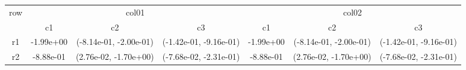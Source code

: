 \begin{tabular}{ccccccc}
\toprule
\multirow{2}{*}{row}&\multicolumn{3}{c}{col01}&\multicolumn{3}{c}{col02}\tabularnewline
\cmidrule(lr){2-4}
\cmidrule(lr){5-7}
&c1&c2&c3&c1&c2&c3\tabularnewline
\midrule
r1&-1.99e+00& (-8.14e-01, -2.00e-01)& (-1.42e-01, -9.16e-01)&-1.99e+00& (-8.14e-01, -2.00e-01)& (-1.42e-01, -9.16e-01)\tabularnewline
r2&-8.88e-01& (2.76e-02, -1.70e+00)& (-7.68e-02, -2.31e-01)&-8.88e-01& (2.76e-02, -1.70e+00)& (-7.68e-02, -2.31e-01)\tabularnewline
\bottomrule
\end{tabular}
